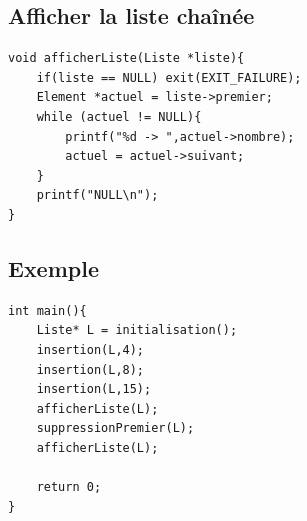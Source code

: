 \documentclass[a4paper]{article}
\begin{document}
\subsection{Afficher la liste chaînée}
\begin{verbatim}
void afficherListe(Liste *liste){
    if(liste == NULL) exit(EXIT_FAILURE);
    Element *actuel = liste->premier;
    while (actuel != NULL){
        printf("%d -> ",actuel->nombre);
        actuel = actuel->suivant;
    }
    printf("NULL\n");
}
\end{verbatim}
\subsection{Exemple}
\begin{verbatim}
int main(){
    Liste* L = initialisation();
    insertion(L,4);
    insertion(L,8);
    insertion(L,15);
    afficherListe(L);
    suppressionPremier(L);
    afficherListe(L);
    
    return 0;
}
\end{verbatim}
\end{document}
